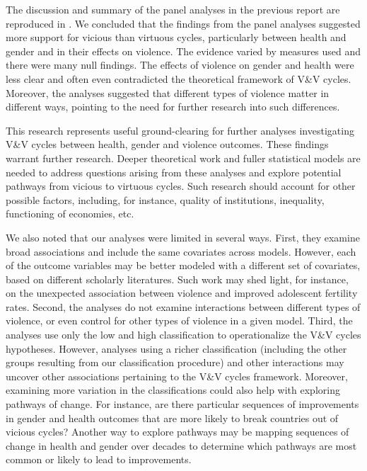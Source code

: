 \documentclass[12pt]{article}
\begin{document}
The discussion and summary of the panel analyses in the previous report are reproduced in .
We concluded that the findings from the panel analyses suggested more support for vicious than virtuous cycles, particularly between health and gender and in their effects on violence. The evidence varied by measures used and there were many null findings. The effects of violence on gender and health were less clear and often even contradicted the theoretical framework of V\&V cycles. Moreover, the analyses suggested that different types of violence matter in different ways, pointing to the need for further research into such differences.

This research represents useful ground-clearing for further analyses investigating V\&V cycles between health, gender and violence outcomes. These findings warrant further research.
Deeper theoretical work and fuller statistical models are needed to address questions arising from these analyses and explore potential pathways from vicious to virtuous cycles. Such research should account for other possible factors, including, for instance, quality of institutions, inequality, functioning of economies, etc.

We also noted that our analyses were limited in several ways.
First, they examine broad associations and include the same covariates across models.
However, each of the outcome variables may be better modeled with a different set of covariates, based on different scholarly literatures.
Such work may shed light, for instance, on the unexpected association between violence and improved adolescent fertility rates.
Second, the analyses do not examine interactions between different types of violence, or even control for other types of violence in a given model.
Third, the analyses use only the low and high classification to operationalize the V\&V cycles hypotheses.
However, analyses using a richer classification (including the other groups resulting from our classification procedure) and other interactions may uncover other associations pertaining to the V\&V cycles framework.
Moreover, examining more variation in the classifications could also help with exploring pathways of change. For instance, are there particular sequences of improvements in gender and health outcomes that are more likely to break countries out of vicious cycles?
Another way to explore pathways may be mapping sequences of change in health and gender over decades to determine which pathways are most common or likely to lead to improvements.
\end{document}
